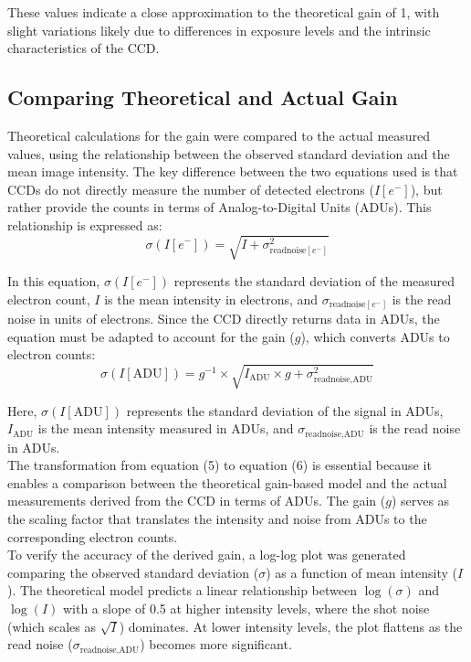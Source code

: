 \documentclass[linenumbers,twocolumn]{aastex631}
\begin{document}
These values indicate a close approximation to the theoretical gain of 1, with slight variations likely due to differences in exposure levels and the intrinsic characteristics of the CCD.

\subsection{Comparing Theoretical and Actual Gain}
Theoretical calculations for the gain were compared to the actual measured values, using the relationship between the observed standard deviation and the mean image intensity. The key difference between the two equations used is that CCDs do not directly measure the number of detected electrons (\(I[e^{-}]\)), but rather provide the counts in terms of Analog-to-Digital Units (ADUs). This relationship is expressed as:
\begin{equation}
    \sigma(I[e^{-}]) = \sqrt{I + \sigma^{2}_{\text{readnoise}[e^{-}]}}
\end{equation}

In this equation, \(\sigma(I[e^{-}])\) represents the standard deviation of the measured electron count, \(I\) is the mean intensity in electrons, and \(\sigma_{\text{readnoise}[e^{-}]}\) is the read noise in units of electrons. Since the CCD directly returns data in ADUs, the equation must be adapted to account for the gain (\(g\)), which converts ADUs to electron counts:
\begin{equation}
\sigma(I[\text{ADU}]) = g^{-1} \times \sqrt{I_{\text{ADU}} \times g + \sigma_{\text{readnoise,ADU}}^2}
\end{equation}

Here, \(\sigma(I[\text{ADU}])\) represents the standard deviation of the signal in ADUs, \(I_{\text{ADU}}\) is the mean intensity measured in ADUs, and \(\sigma_{\text{readnoise,ADU}}\) is the read noise in ADUs. \\

The transformation from equation (5) to equation (6) is essential because it enables a comparison between the theoretical gain-based model and the actual measurements derived from the CCD in terms of ADUs. The gain (\(g\)) serves as the scaling factor that translates the intensity and noise from ADUs to the corresponding electron counts. \\

To verify the accuracy of the derived gain, a log-log plot was generated comparing the observed standard deviation (\(\sigma\)) as a function of mean intensity (\(I\)). The theoretical model predicts a linear relationship between \(\log(\sigma)\) and \(\log(I)\) with a slope of 0.5 at higher intensity levels, where the shot noise (which scales as \(\sqrt{I}\)) dominates. At lower intensity levels, the plot flattens as the read noise (\(\sigma_{\text{readnoise,ADU}}\)) becomes more significant. \\
\end{document}
